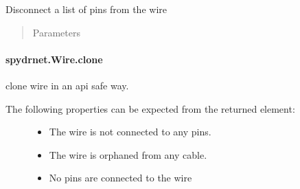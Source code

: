 \documentclass[letterpaper,10pt,english,openany,oneside]{sphinxmanual}
\begin{document}
\begin{fulllineitems}
\label{\detokenize{reference/classes/generated/spydrnet.Wire.disconnect_pins_from:spydrnet.Wire.disconnect_pins_from}}
Disconnect a list of pins from the wire
\begin{quote}\begin{description}
\item[{Parameters}] \leavevmode
{}

\end{description}\end{quote}

\end{fulllineitems}



\paragraph{spydrnet.Wire.clone}
\label{\detokenize{reference/classes/generated/spydrnet.Wire.clone:spydrnet-wire-clone}}\label{\detokenize{reference/classes/generated/spydrnet.Wire.clone::doc}}

\begin{fulllineitems}
\label{\detokenize{reference/classes/generated/spydrnet.Wire.clone:spydrnet.Wire.clone}}
clone wire in an api safe way.
\begin{description}
\item[{The following properties can be expected from the returned element:}] \leavevmode\begin{itemize}
\item {} 
The wire is not connected to any pins.

\item {} 
The wire is orphaned from any cable.

\item {} 
No pins are connected to the wire

\end{itemize}

\end{description}

\end{fulllineitems}
\end{document}
